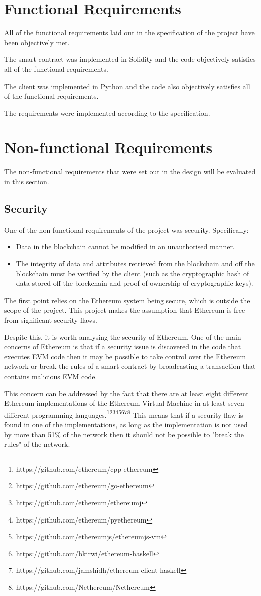 \documentclass[12pt,a4paper]{report}
\begin{document}
	\section{Functional Requirements}
	All of the functional requirements laid out in the specification of the project have been objectively met.
	
	The smart contract was implemented in Solidity and the code objectively satisfies all of the functional requirements.
	
	The client was implemented in Python and the code also objectively satisfies all of the functional requirements.
	
	The requirements were implemented according to the specification.
	\section{Non-functional Requirements}
	The non-functional requirements that were set out in the design will be evaluated in this section.
	
	\subsection{Security}
	One of the non-functional requirements of the project was security. Specifically:
	\begin{itemize}
		\item Data in the blockchain cannot be modified in an unauthorised manner.
		\item The integrity of data and attributes retrieved from the blockchain and off the blockchain must be verified by the client (such as the cryptographic hash of data stored off the blockchain and proof of ownership of cryptographic keys).
	\end{itemize}
	
	The first point relies on the Ethereum system being secure, which is outside the scope of the project. This project makes the assumption that Ethereum is free from significant security flaws.
	
	Despite this, it is worth analysing the security of Ethereum. One of the main concerns of Ethereum is that if a security issue is discovered in the code that executes EVM code then it may be possible to take control over the Ethereum network or break the rules of a smart contract by broadcasting a transaction that contains malicious EVM code.
	
	This concern can be addressed by the fact that there are at least eight different Ethereum implementations of the Ethereum Virtual Machine in at least seven different programming languages.\footnote{https://github.com/ethereum/cpp-ethereum}\footnote{https://github.com/ethereum/go-ethereum}\footnote{https://github.com/ethereum/ethereumj}\footnote{https://github.com/ethereum/pyethereum}\footnote{https://github.com/ethereumjs/ethereumjs-vm}\footnote{https://github.com/bkirwi/ethereum-haskell}\footnote{https://github.com/jamshidh/ethereum-client-haskell}\footnote{https://github.com/Nethereum/Nethereum} This means that if a security flaw is found in one of the implementations, as long as the implementation is not used by more than 51\% of the network then it should not be possible to "break the rules" of the network.
	
\end{document}
